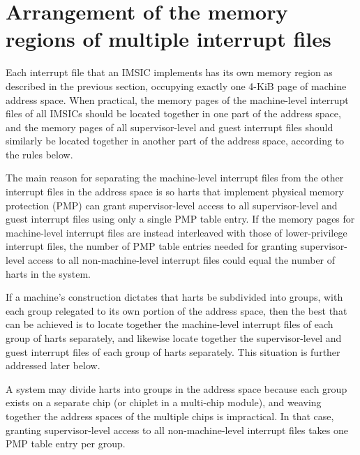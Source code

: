\section{Arrangement of the memory regions of multiple interrupt files}
\label{sec:IMSIC-systemMemRegions}

Each interrupt file that an IMSIC implements has its own memory
region as described in the previous section, occupying exactly one
\mbox{4-KiB} page of machine address space.
When practical, the memory pages of the machine-level interrupt files
of all IMSICs should be located together in one part of the address
space, and the memory pages of all supervisor-level and guest interrupt
files should similarly be located together in another part of the
address space, according to the rules below.

\begin{commentary}
The main reason for separating the machine-level interrupt files
from the other interrupt files in the address space is so harts that
implement physical memory protection (PMP) can grant supervisor-level
access to all supervisor-level and guest interrupt files using only a
single PMP table entry.
If the memory pages for machine-level interrupt files are instead
interleaved with those of lower-privilege interrupt files, the number
of PMP table entries needed for granting supervisor-level access to all
non-machine-level interrupt files could equal the number of harts in
the system.
\end{commentary}

If a machine's construction dictates that harts be subdivided into
groups, with each group relegated to its own portion of the address
space, then the best that can be achieved is to locate together the
machine-level interrupt files of each group of harts separately, and
likewise locate together the supervisor-level and guest interrupt files
of each group of harts separately.
This situation is further addressed later below.

\begin{commentary}
A system may divide harts into groups in the address space because each
group exists on a separate chip (or chiplet in a multi-chip module),
and weaving together the address spaces of the multiple chips is
impractical.
In that case, granting supervisor-level access to all non-machine-level
interrupt files takes one PMP table entry per group.
\end{commentary}

